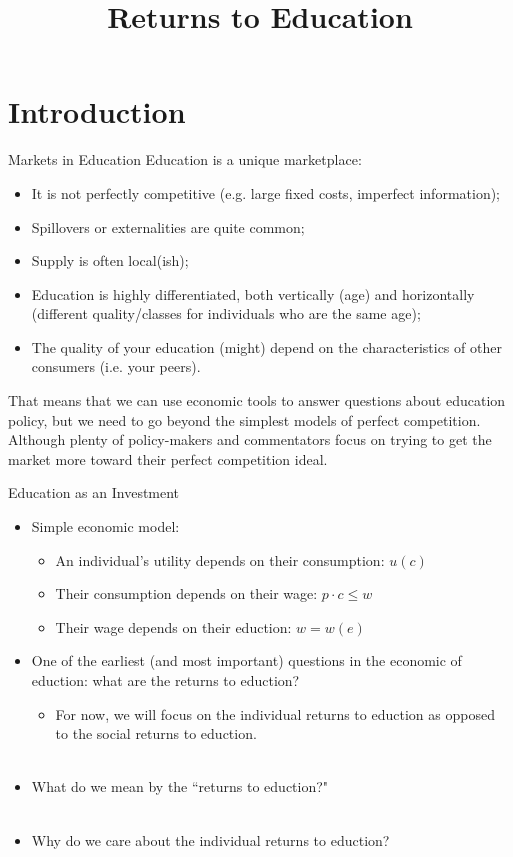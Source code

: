 \documentclass{beamer}
\title{Returns to Education}
\begin{document}
\maketitle

\section{Introduction}

\begin{frame}{Markets in Education}
Education is a unique marketplace:
	\begin{itemize}
	\item It is not perfectly competitive (e.g. large fixed costs, imperfect information);
	\item Spillovers or externalities are quite common;
	\item Supply is often local(ish);
	\item Education is highly differentiated, both vertically (age) and horizontally (different quality/classes for individuals who are the same age);
	\item The quality of your education (might) depend on the characteristics of other consumers (i.e. your peers).
	\end{itemize}
That means that we can use economic tools to answer questions about education policy, but we need to go beyond the simplest models of perfect competition. Although plenty of policy-makers and commentators focus on trying to get the market more toward their perfect competition ideal.
\end{frame}

\begin{frame}[<+->]{Education as an Investment}
\begin{itemize}
	\item Simple economic model:
	\begin{itemize}
	\item An individual's utility depends on their consumption: $u(c)$
	\item Their consumption depends on their wage: $p \cdot c \leq w$
	\item Their wage depends on their eduction: $w = w(e)$
	\end{itemize}
\item One of the earliest (and most important) questions in the economic of eduction: what are the returns to eduction?
	\begin{itemize}
	\item For now, we will focus on the individual returns to eduction as opposed to the social returns to eduction.  \\~\\
	\end{itemize}
\item What do we mean by the ``returns to eduction?" \\~\\
\item Why do we care about the individual returns to eduction?
\end{itemize}
\end{frame}
\end{document}
